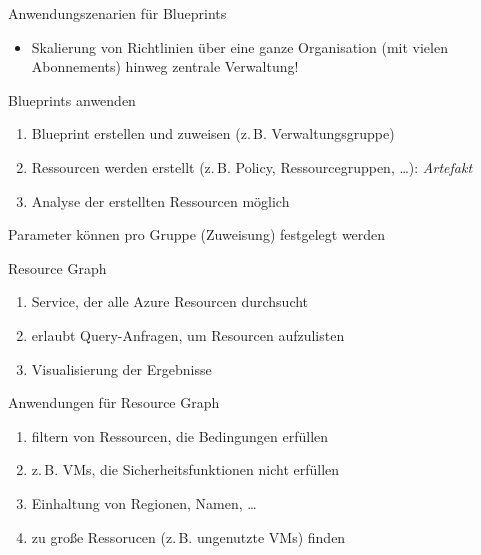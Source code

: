 \begin{flashcard}[Definition]{Anwendungszenarien für Blueprints}
  \begin{itemize}
    \item Skalierung von Richtlinien über eine ganze Organisation (mit vielen Abonnements) hinweg\newline
      zentrale Verwaltung!
  \end{itemize}
\end{flashcard}

\begin{flashcard}[Definition]{Blueprints anwenden}
  \begin{enumerate}
    \item Blueprint erstellen und zuweisen (z.\,B. Verwaltungsgruppe)
    \item Ressourcen werden erstellt (z.\,B. Policy, Ressourcegruppen, \ldots): \emph{Artefakt}
    \item Analyse der erstellten Ressourcen möglich
  \end{enumerate}
  Parameter können pro Gruppe (Zuweisung) festgelegt werden
\end{flashcard}


\begin{flashcard}[Definition]{Resource Graph}
  \begin{enumerate}
    \item Service, der alle Azure Resourcen durchsucht
    \item erlaubt Query-Anfragen, um Resourcen aufzulisten
    \item Visualisierung der Ergebnisse
  \end{enumerate}
\end{flashcard}

\begin{flashcard}[Definition]{Anwendungen für Resource Graph}
  \begin{enumerate}
    \item filtern von Ressourcen, die Bedingungen erfüllen
    \item z.\,B. VMs, die Sicherheitsfunktionen nicht erfüllen
    \item Einhaltung von Regionen, Namen, \ldots
    \item zu große Ressorucen (z.\,B. ungenutzte VMs) finden
  \end{enumerate}
\end{flashcard}
